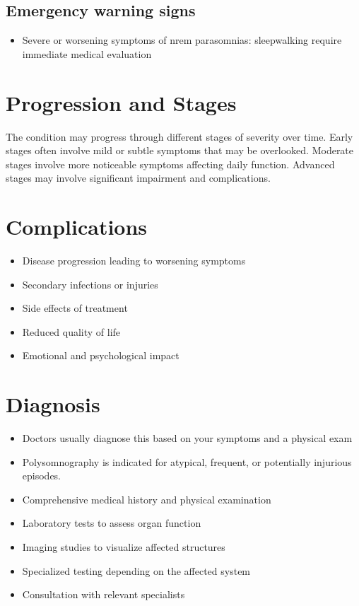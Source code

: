 \subsection{Emergency warning signs}
\begin{itemize}[noitemsep]
  \item Severe or worsening symptoms of nrem parasomnias: sleepwalking require immediate medical evaluation
\end{itemize}
\section{Progression and Stages}
The condition may progress through different stages of severity over time. Early stages often involve mild or subtle symptoms that may be overlooked. Moderate stages involve more noticeable symptoms affecting daily function. Advanced stages may involve significant impairment and complications.
\section{Complications}
\begin{itemize}[noitemsep]
  \item Disease progression leading to worsening symptoms
  \item Secondary infections or injuries
  \item Side effects of treatment
  \item Reduced quality of life
  \item Emotional and psychological impact
\end{itemize}
\section{Diagnosis}
\begin{itemize}[noitemsep]
  \item Doctors usually diagnose this based on your symptoms and a physical exam
  \item Polysomnography is indicated for atypical, frequent, or potentially injurious episodes.
  \item Comprehensive medical history and physical examination
  \item Laboratory tests to assess organ function
  \item Imaging studies to visualize affected structures
  \item Specialized testing depending on the affected system
  \item Consultation with relevant specialists
\end{itemize}
